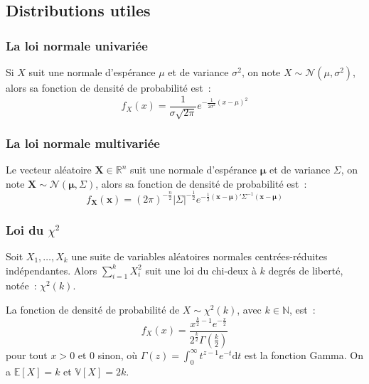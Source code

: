 \documentclass[10pt]{beamer}
\begin{document}
\subsection{Distributions utiles}

\begin{frame}
  \frametitle{La loi normale univariée}

  \begin{defn}{}
    Si $X$ suit une normale d'espérance $\mu$ et de variance $\sigma^2$, on note $X\sim\mathcal N \left(\mu, \sigma^2\right)$, alors sa fonction de densité de probabilité est~:
    \[
      f_X(x) = \frac{1}{\sigma\sqrt{2\pi}}e^{-\frac{1}{2\sigma^2}\left(x-\mu\right)^2}
    \]
  \end{defn}

\end{frame}

\begin{frame}
  \frametitle{La loi normale multivariée}

  \begin{defn}{}
    Le vecteur aléatoire $\bm{X}\in \mathbb R^n$ suit une normale d'espérance $\bm \mu$ et de variance $\Sigma$, on note $\bm{X}\sim\mathcal N \left(\bm\mu, \Sigma\right)$, alors sa fonction de densité de probabilité est~:
    \[
      f_{\bm X}(\bm x) = \left( 2\pi \right)^{-\frac{n}{2}}\left| \Sigma \right|^{-\frac{1}{2}}e^{-\frac{1}{2}\left(\bm x-\bm\mu\right)'\Sigma^{-1}\left(\bm x-\bm\mu\right)}
    \]
  \end{defn}

\end{frame}


\begin{frame}
  \frametitle{Loi du $\chi^2$}

  \begin{defn}{}
    Soit $X_1, \dots, X_k$ une suite de variables aléatoires normales centrées-réduites indépendantes. Alors $\sum_{i=1}^kX_i^2$ suit une loi du chi-deux à $k$ degrés de liberté, notée~: $\chi^2(k)$.
  \end{defn}

  \bigskip

  \begin{prop}\label{prop:chi2}
    La fonction de densité de probabilité de $X\sim\chi^2(k)$,
    avec $k\in\mathbb N$, est~:
    \[
      f_X(x) = \frac{x^{\frac{k}{2}-1}e^{-\frac{x}{2}}}{2^{\frac{k}{2}}\Gamma\left(\frac{k}{2}\right)}
    \]
    pour tout $x>0$ et 0 sinon, où $\Gamma(z) = \int_0^{\infty}t^{z-1}e^{-t}\mathrm dt$ est la
    fonction Gamma. On a $\mathbb E\left[ X \right]=k$ et $\mathbb V\left[ X \right] = 2k$.
  \end{prop}

\end{frame}
\end{document}
